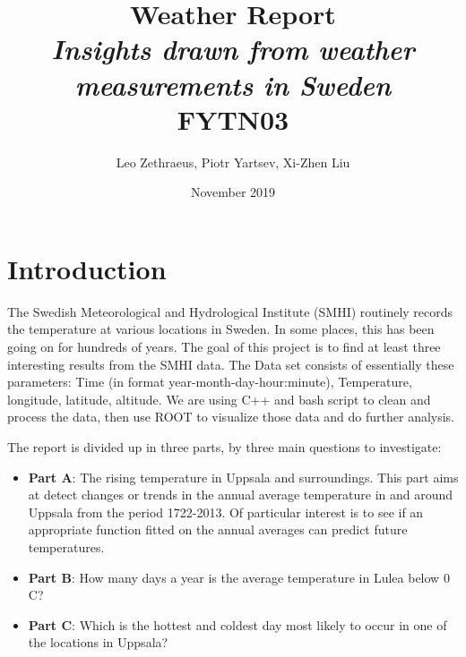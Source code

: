 \documentclass[a4paper]{article}
\begin{document}
\title{Weather Report\\\textit{Insights drawn from weather measurements in Sweden} \\ FYTN03}
\author{Leo Zethraeus, 
Piotr Yartsev, Xi-Zhen Liu} %
\date{November 2019} %
\maketitle
\newpage
\tableofcontents

\newpage

\section{Introduction}\label{sec:intro}
The Swedish Meteorological and Hydrological Institute (SMHI) routinely records the temperature at various locations in Sweden. In some places, this has been going on for hundreds of years. The goal of this project is to find at least three interesting results from the SMHI data. The Data set consists of essentially these parameters: Time (in format year-month-day-hour:minute), Temperature, longitude, latitude, altitude. We are using C++ and bash script to clean and process the data, then use ROOT to visualize those data and do further analysis. 


The report is divided up in three parts, by three main questions to investigate:
\begin{itemize}
\item \textbf{Part A}: The rising temperature in Uppsala and surroundings. This part aims at detect changes or trends in the annual average temperature in and around Uppsala from the period 1722-2013. Of particular interest is to see if an appropriate function fitted on the annual averages can predict future temperatures.\\

\item \textbf{Part B}: How many days a year is the average temperature in Lulea below 0 C\degree?

\item \textbf{Part C}: Which is the hottest and coldest day most likely to occur in one of the locations in Uppsala?
\end{itemize}
\end{document}
